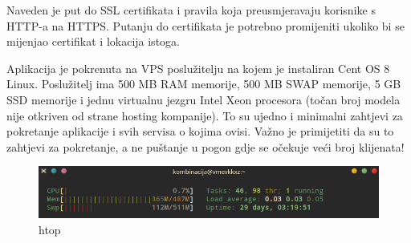 		Naveden je put do SSL certifikata i pravila koja preusmjeravaju korisnike s HTTP-a na HTTPS. Putanju do certifikata je potrebno promijeniti ukoliko bi se mijenjao certifikat i lokacija istoga.\\
		
		
		Aplikacija je pokrenuta na VPS poslužitelju na kojem je instaliran Cent OS 8 Linux. Poslužitelj ima 500 MB RAM memorije, 500 MB SWAP memorije, 5 GB SSD memorije i jednu virtualnu jezgru Intel Xeon procesora (točan broj modela nije otkriven od strane hosting kompanije). To su ujedno i minimalni zahtjevi za pokretanje aplikacije i svih servisa o kojima ovisi. Važno je primijetiti da su to zahtjevi za pokretanje, a ne puštanje u pogon gdje se očekuje veći broj klijenata!
		
		\begin{figure}[H]
					\includegraphics[scale=0.8]{figures/7-htop.PNG}
					\centering
					\caption{htop}
					\label{fig:htop}
				\end{figure} 
		
		\eject 